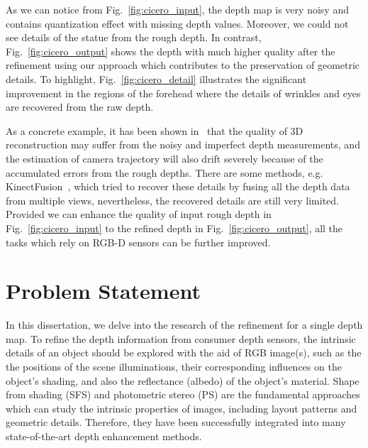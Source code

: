 As we can notice from Fig.~\ref{fig:cicero_input}, the depth map is very noisy and contains quantization effect with missing depth values.
Moreover, we could not see details of the statue from the rough depth.
In contrast, Fig.~\ref{fig:cicero_output} shows the depth with much higher quality after the refinement using our approach which contributes to the preservation of geometric details.
To highlight, Fig.~\ref{fig:cicero_detail} illustrates the significant improvement in the regions of the forehead where the details of wrinkles and eyes are recovered from the raw depth. 


As a concrete example, it has been shown in~\cite{maier2013thesis} that the quality of 3D reconstruction may suffer from the noisy and imperfect depth measurements, and the estimation of camera trajectory will also drift severely because of the accumulated errors from the rough depths.
There are some methods, e.g. KinectFusion~\cite{newcombe2011kinectfusion}, which tried to recover these details by fusing all the depth data from multiple views, nevertheless, the recovered details are still very limited.
Provided we can enhance the quality of input rough depth in Fig.~\ref{fig:cicero_input} to the refined depth in Fig.~\ref{fig:cicero_output}, all the tasks which rely on RGB-D sensors can be further improved. 

\section{Problem Statement}

In this dissertation, we delve into the research of the refinement for a single depth map.
To refine the depth information from consumer depth sensors, the intrinsic details of an object should be explored with the aid of RGB image(s), such as the the positions of the scene illuminations, their corresponding influences on the object's shading, and also the reflectance (albedo) of the object's material.
Shape from shading (SFS) and photometric stereo (PS) are the fundamental approaches which can study the intrinsic properties of images, including layout patterns and geometric details. 
Therefore, they have been successfully integrated into many state-of-the-art depth enhancement methods.

